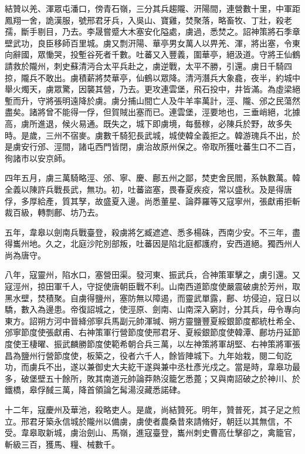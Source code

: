 \begin{pinyinscope}
 結贊以羌、渾眾屯潘口，傍青石嶺，三分其兵趨隴、汧陽間，連營數十里，中軍距鳳翔一舍，詭漢服，號邢君牙兵，入吳山、寶雞，焚聚落，略畜牧、丁壯，殺老孺，斷手剔目，乃去。李晟嘗蹙大木塞安化隘處，虜過，悉焚之。詔神策將石季章壁武功，良臣移師百里城。虜又剽汧陽、華亭男女萬人以畀羌、渾，將出塞，令東向辭國，眾慟哭，投塹谷死者千數。吐蕃又入豐義，圍華亭，絕汲道。守將王仙鶴請救於隴州，刺史蘇清沔合太平兵赴之，虜逆戰，太平不勝，引還。虜日千騎四掠，隴兵不敢出。虜積薪將焚華亭，仙鶴以眾降。清沔潛兵大象龕，夜半，約城中舉火燭天，虜眾驚，因襲其營，乃去。更攻連雲堡，飛石投中，井皆滿。為虛梁絕塹而升，守將張明遠降於虜。虜分捕山間亡人及牛羊率萬計，涇、隴、邠之民蕩然盡矣。諸將曾不能得一俘，但賀賊出塞而已。連雲堡，涇要地也，三垂峭絕，北據高，虜所進退，候火易通。既失之，城下即虜境，每藝稼，必陳兵於野，故多失時。是歲，三州不宿麥。虜數千騎犯長武城，城使韓全義拒之。韓游瑰兵不出，於是虜安行邠、涇間，諸屯西門皆閉，虜治故原州保之。帝取所獲吐蕃生口不二百，徇諸市以安京師。



 四年五月，虜三萬騎略涇、邠、寧、慶、鄜五州之鄙，焚吏舍民閻，系執數萬。韓全義以陳許兵戰長武，無功。初，吐蕃盜塞，畏春夏疾疫，常以盛秋。及是得唐俘，多厚給產，質其孥，故盛夏入邊。尚悉董星、論莽羅等又寇寧州，張獻甫拒斬裁百級，轉剽鄜、坊乃去。



 五年，韋皋以劍南兵戰臺登，殺虜將乞臧遮遮、悉多楊硃，西南少安。不三年，盡得巂州地。久之，北庭沙陀別部叛，吐蕃因是陷北庭都護府，安西道絕。獨西州人尚為唐守。



 八年，寇靈州，陷水口，塞營田渠。發河東、振武兵，合神策軍擊之，虜引還。又寇涇州，掠田軍千人，守捉使唐朝臣戰不利。山南西道節度使嚴震破虜於芳州，取黑水壁，焚積聚。自虜得鹽州，塞防無以障遏，而靈武單露，鄜、坊侵迫，寇日以驕，數入為邊患。帝復詔城之，使涇原、劍南、山南深入窮討，分其兵，毋令專向東方。詔朔方河中晉絳邠寧兵馬副元帥渾瑊、朔方靈鹽豐夏綏銀節度都統杜希全、邠寧節度使張獻甫、右神策軍行營節度使邢君牙、夏綏銀節度使韓潭、鄜坊丹延節度使王棲曜、振武麟勝節度使範希朝合兵三萬，以左神策將軍胡堅、右神策將軍張昌為鹽州行營節度使，板築之，役者六千人，餘皆陣城下。九年始栽，閱二旬訖功，而虜兵不出，遂以兼御史大夫紇干遂與兼中丞杜彥光戍之。當是時，韋皋功最多，破堡壁五十餘所，敗其南道元帥論莽熱沒籠乞悉蓖；又與南詔破之於神川、於鐵橋，皋俘馘三萬，降首領論乞髯湯沒藏悉諾硉。



 十二年，寇慶州及華池，殺略吏人。是歲，尚結贊死。明年，贊普死，其子足之煎立。邢君牙築永信城於隴州以備虜，虜使者農桑昔來請脩好，朝廷以其無信，不受。韋皋取新城，虜治劍山、馬嶺，進寇臺登，巂州刺史曹高仕擊卻之，禽籠官，斬級三百，獲馬、糧、械數千。




\end{pinyinscope}
